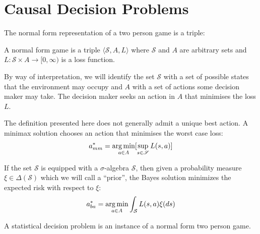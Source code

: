 \section{Causal Decision Problems}

The normal form representation of a two person game is a triple:

\begin{definition}
A normal form game is a triple $\langle \mathscr{S}, A, L\rangle$ where $\mathscr{S}$ and $A$ are arbitrary sets and $L:\mathscr{S}\times A\to [0,\infty)$ is a loss function.

By way of interpretation, we will identify the set $\mathscr{S}$ with a set of possible states that the environment may occupy and $A$ with a set of actions some decision maker may take. The decision maker seeks an action in $A$ that minimises the loss $L$.
\end{definition}

The definition presented here does not generally admit a unique best action. A minimax solution chooses an action that minimises the worst case loss:
\begin{align}
    a^*_{mm} = \operatorname*{arg\,min}_{a\in A} [\sup_{s\in \mathscr{S}} L(s,a)]\label{eq:mm_soln}
\end{align}

If the set $\mathscr{S}$ is equipped with a $\sigma$-algebra $\mathcal{S}$, then given a probability measure $\xi\in \Delta(\mathcal{S})$ which we will call a ``prior'', the Bayes solution minimizes the expected risk with respect to $\xi$:
\begin{align}
    a^*_{ba} = \operatorname*{arg\,min}_{a\in A} \int_{\mathcal{S}} L(s,a) \xi(ds)
\end{align}

A statistical decision problem is an instance of a normal form two person game.

